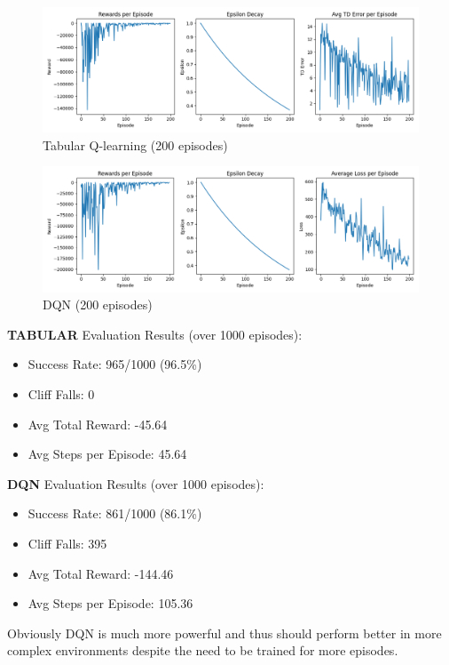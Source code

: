 \documentclass[a4paper,12pt]{article}
\begin{document}
\begin{figure}[H]
    \centering
    \includegraphics[width=\linewidth]{plot_tabular_200ep.png}
    \caption{Tabular Q-learning (200 episodes)}
\end{figure}
\begin{figure}[H]
    \centering
    \includegraphics[width=\linewidth]{plot_dqn200ep.png}
    \caption{DQN (200 episodes)}
\end{figure}
\noindent \textbf{TABULAR} Evaluation Results (over 1000 episodes):
\begin{itemize}
    \item Success Rate: 965/1000 (96.5\%)
    \item Cliff Falls: 0
    \item Avg Total Reward: -45.64
    \item Avg Steps per Episode: 45.64
\end{itemize}
\textbf{DQN} Evaluation Results (over 1000 episodes):
\begin{itemize}
    \item Success Rate: 861/1000 (86.1\%)
    \item Cliff Falls: 395
    \item Avg Total Reward: -144.46
    \item Avg Steps per Episode: 105.36
\end{itemize}

\noindent Obviously DQN is much more powerful and thus should perform better in more complex environments despite the need to be trained for more episodes.
\end{document}
